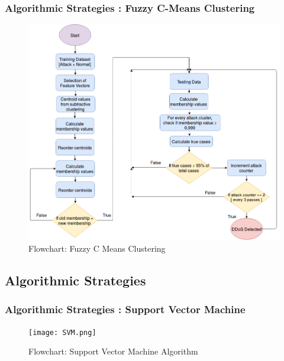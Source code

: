 \documentclass[10pt]{beamer}
\begin{document}
\begin{frame}
\frametitle{Algorithmic Strategies : Fuzzy C-Means Clustering}
\begin{figure}
\includegraphics[scale=0.27]{fuzzy.png}
\caption{\footnotesize Flowchart: Fuzzy C Means Clustering}
\end{figure}
\end{frame}


\begin{frame}
\section[]{Algorithmic Strategies}
\frametitle{Algorithmic Strategies : Support Vector Machine}
\begin{figure}
\texttt{[image: SVM.png]}
\caption{\footnotesize Flowchart: Support Vector Machine Algorithm}
\end{figure}
\end{frame}
\end{document}
